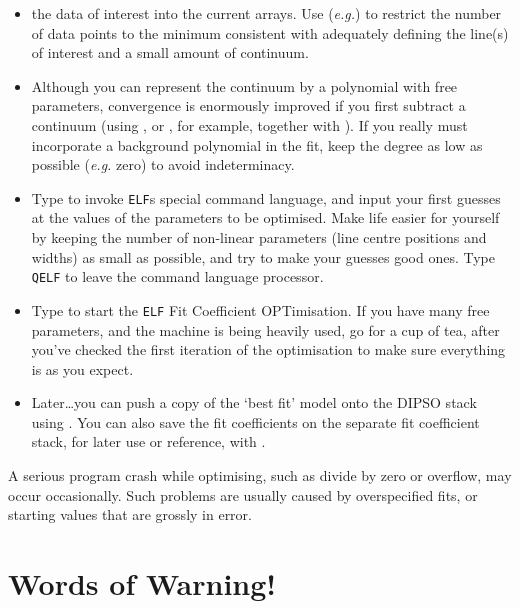 \documentclass[twoside,11pt,noabs,nolof]{starlink}
\begin{document}
\begin{itemize}

\item {}  the data of interest into the current arrays. Use (\emph{e.g.})   to restrict the number of data points to the minimum
consistent with adequately defining the line(s) of interest and a
small amount of continuum.

\item Although you can represent the continuum by a polynomial with
free parameters, convergence is enormously improved if you first
subtract a continuum (using ,  or ,  for example,
together with ).  If you really must incorporate a background
polynomial in the fit, keep the degree as low as possible (\emph{e.g.}
zero) to avoid indeterminacy.

\item Type   to invoke {\texttt{ELF}}s  special command language,
and input your first guesses at the values of the parameters to be
optimised. Make life easier for yourself by keeping the number of
non-linear parameters (line centre positions and widths) as small as
possible, and try to make your guesses good ones. Type {\texttt{QELF}}  to
leave the command language processor.

\item Type   to start the {\texttt{ELF}}  Fit Coefficient
OPTimisation. If you have many free parameters, and the machine is
being heavily used, go for a cup of tea, after you've checked the
first iteration of the optimisation to make sure everything is as you
expect.

\item Later\ldots you can push a copy of the `best fit' model onto the
DIPSO stack using .  You can also save the fit
coefficients on the separate fit coefficient stack, for later use or
reference, with .

\end{itemize}

A serious program crash while optimising, such as divide by zero or
overflow, may occur occasionally. Such problems are usually caused by
overspecified fits, or starting values that are grossly in error.

\section {Words of Warning!}
\end{document}
